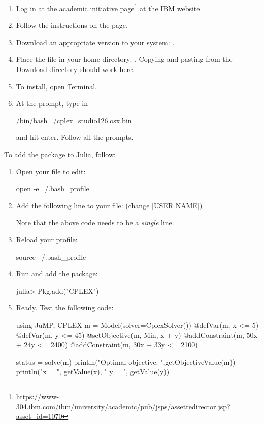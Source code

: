 \begin{enumerate}
\item Log in at \href{https://www-304.ibm.com/ibm/university/academic/pub/jsps/assetredirector.jsp?asset_id=1070}{the academic initiative page}\footnote{\url{https://www-304.ibm.com/ibm/university/academic/pub/jsps/assetredirector.jsp?asset_id=1070}} at the IBM website.
\item Follow the instructions on the page.
\item Download an appropriate version to your system: .
\item Place the file in your home directory: . Copying and pasting from the Download directory should work here.
\item To install, open Terminal.
\item At the prompt, type in
\begin{code}
/bin/bash ~/cplex_studio126.osx.bin
\end{code}
\noindent and hit enter. Follow all the prompts.
\end{enumerate}


To add the  package to Julia, follow:
\begin{enumerate}
\item Open your  file to edit:
\begin{code}
open -e ~/.bash_profile
\end{code}
\item  Add the following line to your  file: (change [USER NAME])
\noindent Note that the above code needs to be a \emph{single} line.
\item Reload your profile:
\begin{code}
source ~/.bash_profile
\end{code}

\item Run \julia{} and add the  package:
\begin{code}
julia> Pkg.add("CPLEX")
\end{code}

\item Ready. Test the following code:
\begin{code}
using JuMP, CPLEX
m = Model(solver=CplexSolver())
@defVar(m, x <= 5)
@defVar(m, y <= 45)
@setObjective(m, Min, x + y)
@addConstraint(m, 50x + 24y <= 2400)
@addConstraint(m, 30x + 33y <= 2100)

status = solve(m)
println("Optimal objective: ",getObjectiveValue(m))
println("x = ", getValue(x), " y = ", getValue(y))
\end{code}
\end{enumerate}




